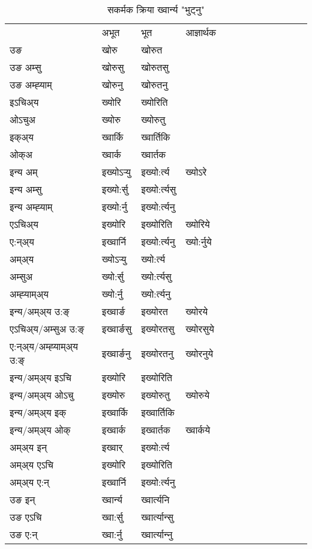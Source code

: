 \begin{table}[H]
\label{or.vt} \centering
\caption{सकर्मक क्रिया  ख्‍वार्न्य  "भुट्नु"  }
\begin{tabular}{l|l|l|l|l|l|l|l|l|l|l|l|l}  \toprule
&अभूत & भूत & आज्ञार्थक \\ 
उङ &खोरु &खोरुत \\ 
उङ अम्सु &खोरुसु &खोरुतसु \\ 
उङ अम्ह्‍याम् &खोरुनु &खोरुतनु \\ 
इऽचिअ्य &ख्योरि &ख्योरिति   \\ 
ओऽचुअ &ख्योरु &ख्योरुतु   \\ 
इक्अ्य &ख्‍वार्कि &ख्‍वार्तिकि   \\ 
ओक्अ &ख्‍वार्क &ख्‍वार्तक   \\ 
इन्य अम् & इख्योऽर्‍यु  & इख्यो:र्त्य &ख्योऽरे  \\ 
इन्य अम्सु & इख्यो:र्सु  & इख्यो:र्त्यसु   \\ 
इन्य अम्ह्‍याम् & इख्यो:र्नु  & इख्यो:र्त्यनु   \\ 
एऽचिअ्य & इख्योरि & इख्योरिति &ख्योरिये    \\ 
ए:न्अ्य & इख्‍वार्नि  & इख्यो:र्त्यनु &ख्यो:र्नुये  \\ 
अम्अ्य & ख्योऽर्‍यु  & ख्यो:र्त्य  \\ 
अम्सुअ & ख्यो:र्सु & ख्यो:र्त्यसु  \\ 
अम्ह्‍याम्अ्य & ख्यो:र्नु  & ख्यो:र्त्यनु \\ 
\midrule
इन्य/अम्अ्य उ:ङ्‌&इख्‍वार्ङ & इख्योरत &ख्योरये \\ 
एऽचिअ्य/अम्सुअ उ:ङ्‌ &इख्‍वार्ङसु & इख्योरतसु &ख्योरसुये \\ 
ए:न्अ्य/अम्ह्‍याम्अ्य उ:ङ्‌ &इख्‍वार्ङनु & इख्योरतनु &ख्योरनुये \\ 
इन्य/अम्अ्य इऽचि & इख्योरि & इख्योरिति    \\ 
इन्य/अम्अ्य ओऽचु & इख्योरु & इख्योरुतु  &ख्योरुये  \\ 
इन्य/अम्अ्य इक् & इख्‍वार्कि & इख्‍वार्तिकि   \\ 
इन्य/अम्अ्य ओक् & इख्‍वार्क & इख्‍वार्तक  &ख्‍वार्कये  \\ 
अम्अ्य इन् & इख्‍वार् & इख्यो:र्त्य   \\ 
अम्अ्य एऽचि & इख्योरि & इख्योरिति    \\ 
अम्अ्य ए:न् & इख्‍वार्नि  & इख्यो:र्त्यनु  \\ 
\midrule
उङ इन् & ख्‍वार्न्य  & ख्‍वार्त्यनि  \\ 
उङ एऽचि & ख्‍वा:र्सु  & ख्‍वार्त्यान्सु   \\ 
उङ ए:न्& ख्‍वा:र्नु  & ख्‍वार्त्यान्‍नु   \\ 
\bottomrule
\end{tabular}
\end{table}


